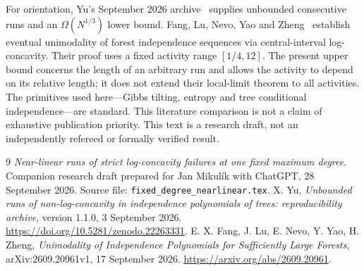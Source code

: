 \documentclass[11pt]{article}
\begin{document}
For orientation, Yu's September 2026 archive~\cite{Yu26} supplies
unbounded consecutive runs and an $\Omega(N^{1/3})$ lower bound.
Fang, Lu, Nevo, Yao and Zheng~\cite{Fang26} establish eventual
unimodality of forest independence sequences via central-interval
log-concavity. Their proof uses a fixed activity range $[1/4,12]$.
The present upper bound concerns the length of an arbitrary run and
allows the activity to depend on its relative length; it does not
extend their local-limit theorem to all activities. The primitives
used here---Gibbs tilting, entropy and tree conditional independence---are
standard. This literature comparison is not a claim of exhaustive
publication priority. This text is a research draft, not an independently
refereed or formally verified result.

\begin{thebibliography}{9}
 \emph{Near-linear runs of strict log-concavity failures
at one fixed maximum degree}. Companion research draft prepared for
Jan Mikul\'ik with ChatGPT, 28 September 2026.
Source file: \texttt{fixed\_degree\_nearlinear.tex}.
 X. Yu, \emph{Unbounded runs of non-log-concavity in
independence polynomials of trees: reproducibility archive}, version
1.1.0, 3 September 2026.
\url{https://doi.org/10.5281/zenodo.22263331}.
 E. X. Fang, J. Lu, E. Nevo, Y. Yao, H. Zheng,
\emph{Unimodality of Independence Polynomials for Sufficiently Large
Forests}, arXiv:2609.20961v1, 17 September 2026.
\url{https://arxiv.org/abs/2609.20961}.
\end{thebibliography}
\end{document}
